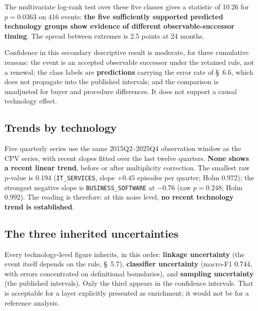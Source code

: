 The multivariate log-rank test over these five classes gives a statistic of 10.26 for \(p = 0.0363\) on 416 events: \textbf{the five sufficiently supported predicted technology groups show evidence of different observable-successor timing}. The spread between extremes is 2.5 points at 24 months.

Confidence in this secondary descriptive result is moderate, for three cumulative reasons: the event is an accepted observable successor under the retained rule, not a renewal; the class labels are \textbf{predictions} carrying the error rate of \S~6.6, which does not propagate into the published intervals; and the comparison is unadjusted for buyer and procedure differences. It does not support a causal technology effect.

\subsection{Trends by technology}

Five quarterly series use the same 2015Q2--2025Q4 observation window as the CPV series, with recent slopes fitted over the last twelve quarters. \textbf{None shows a recent linear trend}, before or after multiplicity correction. The smallest raw p-value is 0.194 (\texttt{IT\_SERVICES}, slope $+0.45$ episodes per quarter; Holm 0.972); the strongest negative slope is \texttt{BUSINESS\_SOFTWARE} at $-0.76$ (raw $p=0.248$; Holm 0.992). The reading is therefore: at this noise level, \textbf{no recent technology trend is established}.

\subsection{The three inherited uncertainties}

Every technology-level figure inherits, in this order: \textbf{linkage uncertainty} (the event itself depends on the rule, \S~5.7), \textbf{classifier uncertainty} (macro-F1 0.744, with errors concentrated on definitional boundaries), and \textbf{sampling uncertainty} (the published intervals). Only the third appears in the confidence intervals. That is acceptable for a layer explicitly presented as enrichment; it would not be for a reference analysis.
